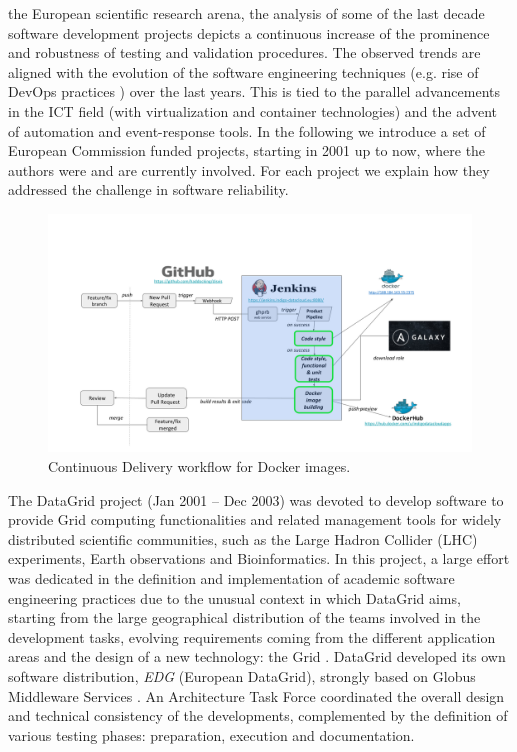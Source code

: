 \documentclass[journal]{IEEEtran}
\begin{document}
 the European scientific research arena, the analysis of some of the last decade software development projects depicts a continuous increase of the prominence and robustness of testing and validation procedures. The observed trends are aligned with the evolution of the software engineering techniques (e.g. rise of DevOps practices \cite{devops}) over the last years. This is tied to the parallel advancements in the ICT field (with virtualization and container technologies) and the advent of automation and event-response tools. In the following we introduce a set of European Commission funded projects, starting in 2001 up to now, where the authors were and are currently involved. For each project we explain how they addressed the challenge in software reliability.

\begin{figure}
\centering
\includegraphics[width=\textwidth]{images/devops.png}
\caption{Continuous Delivery workflow for Docker images.}
\label{fig:fig_CD}
\end{figure}

The DataGrid \cite{cordis:datagrid} project (Jan 2001 -- Dec 2003) was devoted to develop software to provide Grid computing functionalities and related management tools for widely distributed scientific communities, such as the Large Hadron Collider (LHC) experiments, Earth observations and Bioinformatics. In this project, a large effort was dedicated in the definition and implementation of academic software engineering practices due to the unusual context in which DataGrid aims, starting from the large geographical distribution of the teams involved in the development tasks, evolving requirements coming from the different application areas and the design of a new technology: the Grid \cite{datagrid}. DataGrid developed its own software distribution, {\sl EDG} (European DataGrid), strongly based on Globus Middleware Services \cite{globus}. An Architecture Task Force coordinated the overall design and technical consistency of the developments, complemented by the definition of various testing phases: preparation, execution and documentation.
\end{document}

